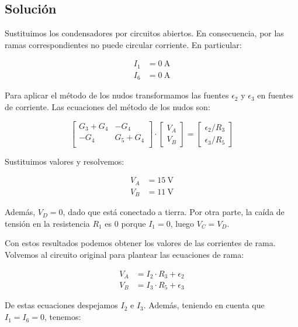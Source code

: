 \documentclass[10pt]{article}
\begin{document}
\subsection*{Solución}

Sustituimos los condensadores por circuitos abiertos. En consecuencia, por las ramas correspondientes no puede circular corriente. En particular:

\begin{align*}
  I_1 &= \SI{0}{\ampere}\\
  I_6 &= \SI{0}{\ampere}
\end{align*}

Para aplicar el método de los nudos transformamos las fuentes $\epsilon_2$ y $\epsilon_3$ en fuentes de corriente. Las ecuaciones del método de los nudos son:

\begin{equation*}
  \begin{bmatrix}
    G_3 + G_4 & -G_4\\
    -G_4 & G_5 + G_4\\
  \end{bmatrix} \cdot %
  \begin{bmatrix}
    V_A\\
    V_B
  \end{bmatrix} = %
  \begin{bmatrix}
    \epsilon_2/R_3\\
    \epsilon_3/R_5
  \end{bmatrix}
\end{equation*}

Sustituimos valores y resolvemos:

\begin{align*}
  V_A &= \SI{15}{\volt}\\
  V_B &= \SI{11}{\volt}
\end{align*}

Además, $V_D = 0$, dado que está conectado a tierra. Por otra parte, la caída de tensión en la resistencia $R_1$ es 0 porque $I_1 = 0$, luego $V_C = V_D$.

Con estos resultados podemos obtener los valores de las corrientes de rama. Volvemos al circuito original para plantear las ecuaciones de rama:

\begin{align*}
  V_A &= I_2 \cdot R_3 + \epsilon_2\\
  V_B &= I_3 \cdot R_5 + \epsilon_3
\end{align*}

De estas ecuaciones despejamos $I_2$ e $I_3$. Además, teniendo en cuenta que $I_1 = I_6 = 0$, tenemos:
\end{document}
